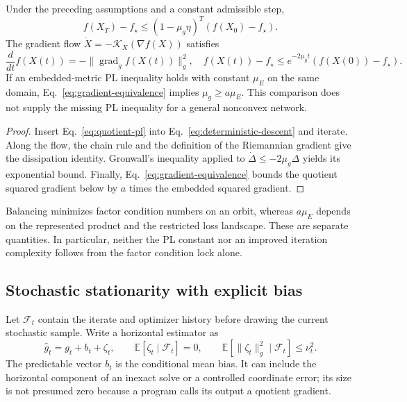 \begin{theorem}
\label{thm:pl}
Under the preceding assumptions and a constant admissible step,
\begin{equation}
 f(X_T)-f_\star\leq(1-\mu_g\eta)^T(f(X_0)-f_\star).
 \label{eq:pl-linear}
\end{equation}
The gradient flow $\dot X=-\mathcal K_X(\nabla f(X))$ satisfies
\begin{equation}
 \frac{d}{dt}f(X(t))=-\|\operatorname{grad}_g f(X(t))\|_g^2,
 \quad f(X(t))-f_\star\leq e^{-2\mu_gt}(f(X(0))-f_\star).
 \label{eq:flow-dissipation}
\end{equation}
If an embedded-metric PL inequality holds with constant $\mu_E$ on
the same domain, Eq.~\eqref{eq:gradient-equivalence} implies
$\mu_g\geq a\mu_E$. This comparison does not supply the missing PL
inequality for a general nonconvex network.
\end{theorem}
\begin{proof}
Insert Eq.~\eqref{eq:quotient-pl} into
Eq.~\eqref{eq:deterministic-descent} and iterate. Along the flow, the
chain rule and the definition of the Riemannian gradient give the
dissipation identity. Gronwall's inequality applied to
$\dot\Delta\leq-2\mu_g\Delta$ yields its exponential bound. Finally,
Eq.~\eqref{eq:gradient-equivalence} bounds the quotient squared gradient
below by $a$ times the embedded squared gradient.
\end{proof}

Balancing minimizes factor condition numbers on an orbit, whereas $a\mu_E$
depends on the represented product and the restricted loss landscape. These
are separate quantities. In particular, neither the PL constant nor an
improved iteration complexity follows from the factor condition lock alone.

\subsection{Stochastic stationarity with explicit bias}
Let $\mathcal F_t$ contain the iterate and optimizer history before drawing
the current stochastic sample. Write a horizontal estimator as
\begin{equation}
 \widehat g_t=g_t+b_t+\zeta_t,\qquad
 \mathbb E[\zeta_t\mid\mathcal F_t]=0,\qquad
 \mathbb E[\|\zeta_t\|_g^2\mid\mathcal F_t]\leq\nu_t^2.
 \label{eq:biased-estimator}
\end{equation}
The predictable vector $b_t$ is the conditional mean bias. It can include
the horizontal component of an inexact solve or a controlled coordinate
error; its size is not presumed zero because a program calls its output
a quotient gradient.

